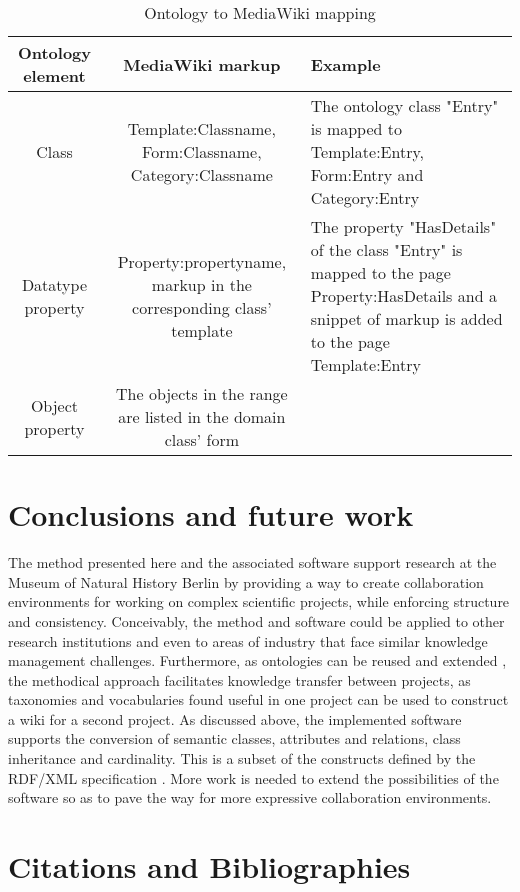 \documentclass[manuscript,screen,review]{acmart}
\begin{document}
\begin{table*}
  \caption{Ontology to MediaWiki mapping}
  \label{tab1}
  \begin{tabular}{ccl}
    \toprule
     Ontology element & MediaWiki markup & Example \\
    \midrule
     Class & Template:Classname, Form:Classname, Category:Classname & The ontology class "Entry" is mapped to Template:Entry, Form:Entry and Category:Entry \\
     Datatype property & Property:propertyname, markup in the corresponding class' template & The property "HasDetails" of the class "Entry" is mapped to the page Property:HasDetails and a snippet of markup is added to the page Template:Entry \\
     Object property & The objects in the range are listed in the domain class' form & 
    \bottomrule
  \end{tabular}
\end{table*}

\section{Conclusions and future work}
The method presented here and the associated software support research at the Museum of Natural History Berlin by providing a way to create collaboration environments for working on complex scientific projects, while enforcing structure and consistency. Conceivably, the method and software could be applied to other research institutions and even to areas of industry that face similar knowledge management challenges. Furthermore, as ontologies can be reused and extended \cite{noy2001}, the methodical approach facilitates knowledge transfer between projects, as taxonomies and vocabularies found useful in one project can be used to construct a wiki for a second project. As discussed above, the implemented software supports the conversion of semantic classes, attributes and relations, class inheritance and cardinality. This is a subset of the constructs defined by the RDF/XML specification \cite{musen2015}. More work is needed to extend the possibilities of the software so as to pave the way for more expressive collaboration environments.

\section{Citations and Bibliographies}

\begin{verbatim}
  
  
\end{verbatim}
\end{document}
